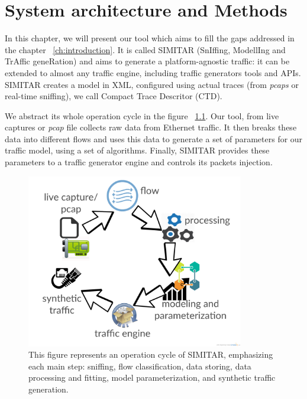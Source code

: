 \chapter{System architecture and Methods}\label{ch:architecture}

In this chapter, we will present our tool which aims to fill the gaps addressed in the chapter ~\ref{ch:introduction}. It is called SIMITAR (SnIffing, ModellIng and TrAffic geneRation) and aims to generate a platform-agnostic traffic: it can be extended to almost any traffic engine, including traffic generators tools and APIs. SIMITAR creates a  model in XML, configured using actual traces (from \textit{pcaps} or real-time sniffing), we call Compact Trace Descritor (CTD). 


We abstract its whole operation cycle in the figure ~\ref{fig:cycle-of-operation}. Our tool, from live captures or \textit{pcap} file collects raw data from Ethernet traffic. It then breaks these data into different flows and uses this data to generate a set of parameters for our traffic model, using a set of algorithms. Finally, SIMITAR provides these parameters to a traffic generator engine and controls its packets injection.

\begin{figure}[ht!]
        \centering
        \includegraphics[height=3.0in]{figures/ch3/digram-project-cycle}
        \caption{This figure represents an operation cycle of SIMITAR, emphasizing each main step: sniffing, flow classification, data storing, data processing and fitting, model parameterization,  and synthetic traffic generation.}
    \label{fig:cycle-of-operation}
\end{figure}


